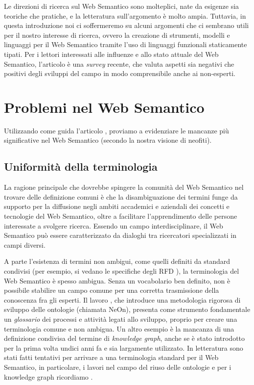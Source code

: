 Le direzioni di ricerca sul Web Semantico sono molteplici, nate da esigenze sia teoriche che pratiche, e la letteratura sull'argomento è molto ampia. Tuttavia, in questa introduzione noi ci soffermeremo su alcuni argomenti che ci sembrano utili per il nostro interesse di ricerca, ovvero la creazione di strumenti, modelli e linguaggi per il Web Semantico tramite l'uso di linguaggi funzionali staticamente tipati. Per i lettori interessati alle influenze e allo stato attuale del Web Semantico, l'articolo \cite{hitzler2021review} è una \emph{survey} recente, che valuta aspetti sia negativi che positivi degli sviluppi del campo in modo comprensibile anche ai non-esperti.
\section{Problemi nel Web Semantico}
Utilizzando come guida l'articolo \cite{hitzler2021review}, proviamo a evidenziare le mancanze più significative nel Web Semantico (secondo la nostra visione di neofiti).
\subsection{Uniformità della terminologia}
\label{sec:consolidamentoTerminologia}
La ragione principale che dovrebbe spingere la comunità del Web Semantico nel trovare delle definizione comuni è che la disambiguazione dei termini funge da supporto per la diffusione negli ambiti accademici e aziendali dei concetti e tecnologie del Web Semantico, oltre a facilitare l'apprendimento delle persone interessate a svolgere ricerca. Essendo un campo interdisciplinare, il Web Semantico può essere caratterizzato da dialoghi tra ricercatori specializzati in campi diversi.
	
A parte l'esistenza di termini non ambigui, come quelli definiti da standard condivisi (per esempio, si vedano le specifiche degli RFD \cite{RDFspecification}), la terminologia del Web Semantico è spesso ambigua. Senza un vocabolario ben definito, non è possibile stabilire un campo comune per una corretta trasmissione della conoscenza fra gli esperti. Il lavoro \cite{NeOn}, che introduce una metodologia rigorosa di sviluppo delle ontologie (chiamata NeOn), presenta come strumento fondamentale un \emph{glossario} dei processi e attività legati allo sviluppo, proprio per creare una terminologia comune e non ambigua.  Un altro esempio è la mancanza di una definizione condivisa del termine di \textit{knowledge graph}, anche se è stato introdotto per la prima volta undici anni fa e sia largamente utilizzato. In letteratura sono stati fatti tentativi per arrivare a una terminologia standard per il Web Semantico, in particolare, i lavori \cite{katsumi2018ontology, goy2015ontologies, NeOn} nel campo del riuso delle ontologie e per i knowledge graph ricordiamo \cite{ehrlinger2016towards}. 
	
